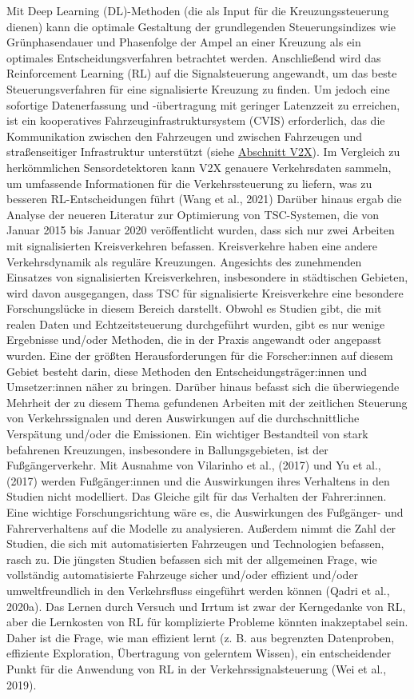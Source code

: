 \documentclass[
]{book}
\begin{document}
Mit Deep Learning (DL)-Methoden (die als Input für die Kreuzungssteuerung dienen) kann die optimale Gestaltung der grundlegenden Steuerungsindizes wie Grünphasendauer und Phasenfolge der Ampel an einer Kreuzung als ein optimales Entscheidungsverfahren betrachtet werden. Anschließend wird das Reinforcement Learning (RL) auf die Signalsteuerung angewandt, um das beste Steuerungsverfahren für eine signalisierte Kreuzung zu finden. Um jedoch eine sofortige Datenerfassung und -übertragung mit geringer Latenzzeit zu erreichen, ist ein kooperatives Fahrzeuginfrastruktursystem (CVIS) erforderlich, das die Kommunikation zwischen den Fahrzeugen und zwischen Fahrzeugen und straßenseitiger Infrastruktur unterstützt (siehe \protect\hyperlink{v2x}{Abschnitt V2X}). Im Vergleich zu herkömmlichen Sensordetektoren kann V2X genauere Verkehrsdaten sammeln, um umfassende Informationen für die Verkehrssteuerung zu liefern, was zu besseren RL-Entscheidungen führt (Wang et al., 2021)
Darüber hinaus ergab die Analyse der neueren Literatur zur Optimierung von TSC-Systemen, die von Januar 2015 bis Januar 2020 veröffentlicht wurden, dass sich nur zwei Arbeiten mit signalisierten Kreisverkehren befassen. Kreisverkehre haben eine andere Verkehrsdynamik als reguläre Kreuzungen. Angesichts des zunehmenden Einsatzes von signalisierten Kreisverkehren, insbesondere in städtischen Gebieten, wird davon ausgegangen, dass TSC für signalisierte Kreisverkehre eine besondere Forschungslücke in diesem Bereich darstellt. Obwohl es Studien gibt, die mit realen Daten und Echtzeitsteuerung durchgeführt wurden, gibt es nur wenige Ergebnisse und/oder Methoden, die in der Praxis angewandt oder angepasst wurden. Eine der größten Herausforderungen für die Forscher:innen auf diesem Gebiet besteht darin, diese Methoden den Entscheidungsträger:innen und Umsetzer:innen näher zu bringen.
Darüber hinaus befasst sich die überwiegende Mehrheit der zu diesem Thema gefundenen Arbeiten mit der zeitlichen Steuerung von Verkehrssignalen und deren Auswirkungen auf die durchschnittliche Verspätung und/oder die Emissionen. Ein wichtiger Bestandteil von stark befahrenen Kreuzungen, insbesondere in Ballungsgebieten, ist der Fußgängerverkehr. Mit Ausnahme von Vilarinho et al., (2017) und Yu et al., (2017) werden Fußgänger:innen und die Auswirkungen ihres Verhaltens in den Studien nicht modelliert. Das Gleiche gilt für das Verhalten der Fahrer:innen. Eine wichtige Forschungsrichtung wäre es, die Auswirkungen des Fußgänger- und Fahrerverhaltens auf die Modelle zu analysieren.
Außerdem nimmt die Zahl der Studien, die sich mit automatisierten Fahrzeugen und Technologien befassen, rasch zu. Die jüngsten Studien befassen sich mit der allgemeinen Frage, wie vollständig automatisierte Fahrzeuge sicher und/oder effizient und/oder umweltfreundlich in den Verkehrsfluss eingeführt werden können (Qadri et al., 2020a).
Das Lernen durch Versuch und Irrtum ist zwar der Kerngedanke von RL, aber die Lernkosten von RL für komplizierte Probleme könnten inakzeptabel sein. Daher ist die Frage, wie man effizient lernt (z. B. aus begrenzten Datenproben, effiziente Exploration, Übertragung von gelerntem Wissen), ein entscheidender Punkt für die Anwendung von RL in der Verkehrssignalsteuerung (Wei et al., 2019).
\end{document}
